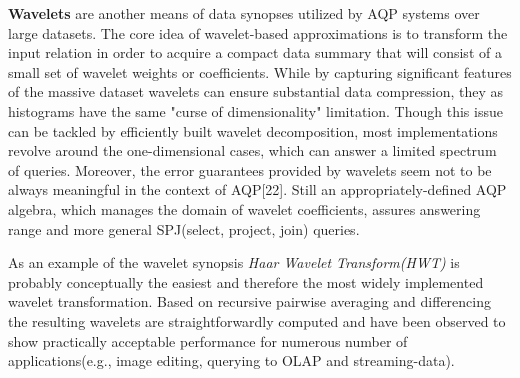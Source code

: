 \documentclass[10pt, conference, compsocconf]{IEEEtran}
\begin{document}
\textbf{Wavelets} are another means of data synopses utilized by AQP systems over large datasets. The core idea of wavelet-based approximations is to transform the input relation in order to acquire a compact data summary that will consist of a small set of wavelet weights or coefficients. While by capturing significant features of the massive dataset wavelets can ensure substantial data compression, they as histograms have the same "curse of dimensionality" limitation. Though this issue can be tackled by efficiently built wavelet decomposition, most implementations revolve around the one-dimensional cases, which can answer a limited spectrum of queries. Moreover, the error guarantees provided by wavelets seem not to be always meaningful in the context of AQP[22]. Still an appropriately-defined AQP algebra, which manages the domain of wavelet coefficients, assures answering range and more general SPJ(select, project, join) queries. 

As an example of the wavelet synopsis \textit{Haar Wavelet Transform(HWT)} is probably conceptually the easiest and therefore the most widely implemented wavelet transformation. Based on recursive pairwise averaging and differencing the resulting wavelets are straightforwardly computed and have been observed to show practically acceptable performance for numerous number of applications(e.g., image editing, querying to OLAP and streaming-data).\\
\end{document}
